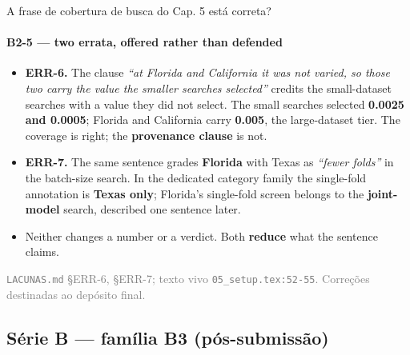 \documentclass{beamer}
\begin{document}
\begin{frame}[noframenumbering]{A frase de cobertura de busca do Cap. 5 está correta?}
    \framesubtitle{B2-5 --- two errata, offered rather than defended}
    \hypertarget{b25}{}
    \small
    \begin{itemize}\setlength{\itemsep}{0pt}\setlength{\parskip}{0pt}
        \item \textbf{ERR-6.} The clause \textit{``at Florida and California it was not varied, so those two carry the value the smaller searches selected''} credits the small-dataset searches with a value they did not select. The small searches selected \textbf{0.0025 and 0.0005}; Florida and California carry \textbf{0.005}, the large-dataset tier. The coverage is right; the \textbf{provenance clause} is not.
        \item \textbf{ERR-7.} The same sentence grades \textbf{Florida} with Texas as \textit{``fewer folds''} in the batch-size search. In the dedicated category family the single-fold annotation is \textbf{Texas only}; Florida's single-fold screen belongs to the \textbf{joint-model} search, described one sentence later.
        \item Neither changes a number or a verdict. Both \textbf{reduce} what the sentence claims.
    \end{itemize}
    \vfill
    {\scriptsize
    \begin{minipage}[b]{0.775\linewidth}\raggedright\textcolor{gray}{\texttt{LACUNAS.md} §ERR-6, §ERR-7; texto vivo \texttt{05\_setup.tex:52-55}. Correções destinadas ao depósito final.}\end{minipage}\hfill
    \begin{minipage}[b]{0.20\linewidth}\raggedleft \hyperlink{b0}{}\end{minipage}}
\end{frame}

\subsection{Série B --- família B3 (pós-submissão)}
\end{document}
